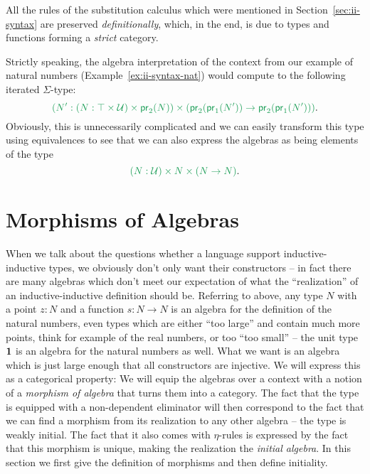 \begin{defn}
All the rules of the substitution calculus which were mentioned in Section~\ref{sec:ii-syntax}
are preserved \emph{definitionally}, which, in the end, is due to types and
functions forming a \emph{strict} category. %


\end{defn}

\begin{example}\label{ex:iit-nat-alg}
Strictly speaking, the algebra interpretation of the
context from our example of natural numbers (Example~\ref{ex:ii-syntax-nat})
would compute to the following iterated $\Sigma$-type:
\begin{equation*}
\grm{\left(N' : (N : \top \times \UU) \times \pr_2(N)\right)
  \times \left(\pr_2(\pr_1(N')) \to \pr_2(\pr_1(N')) \right) } \text{.}
\end{equation*}
Obviously, this is unnecessarily complicated and we can easily transform this
type using equivalences to see that we can also express the algebras as being
elements of the type
\begin{equation*}
\grm{(N : \UU) \times N \times (N \to N)} \text{.}
\end{equation*}
\end{example}


\section{Morphisms of Algebras}

When we talk about the questions whether a language support inductive-inductive
types, we obviously don't only want their constructors --
in fact there are many algebras which don't meet our expectation of what the
``realization'' of an inductive-inductive definition should be.
Referring to  above, any type $N$ with a point $z : N$ and
a function $s : N \to N$ is an algebra for the definition of the natural numbers,
even types which are either ``too large'' and contain much more points,
think for example of the real numbers,
or too ``too small'' -- the unit type $\mathbf{1}$ is an algebra for the natural numbers
as well.
What we want is an algebra which is just large enough that all
constructors are injective.
We will express this as a categorical property:
We will equip the algebras over a context with a notion of a \emph{morphism of algebra}
that turns them into a category.
The fact that the type is equipped with a non-dependent eliminator will then
correspond to the fact that we can find a morphism from its
realization to any other algebra -- the type is weakly initial.
The fact that it also comes with $\eta$-rules is expressed by the fact
that this morphism is unique, making the realization the \emph{initial algebra}.
In this section we first give the definition of morphisms and then define
initiality.

